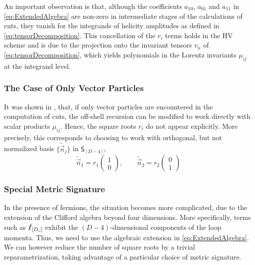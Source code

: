 An important observation is that, although the coefficients 
$a_{10}$, $a_{01}$ and $a_{11}$ in 
\cref{eq:ExtendedAlgebra} are non-zero in
intermediate stages of the calculations of cuts, they vanish
for the integrands of helicity amplitudes as defined in 
\cref{eq:tensorDecomposition}. This cancellation of the
$r_i$ terms holds in the HV scheme and
is due to the projection onto the invariant tensors 
$v_n$ of \cref{eq:tensorDecomposition}, 
which yields polynomials in the Lorentz invariants 
$\mu_{ij}$ at the integrand level.


\subsubsection{The Case of Only Vector Particles}
%
It was shown in \cite{Abreu:2017hqn}, that,
if only vector particles are encountered in the computation of cuts,
the off-shell recursion can be modified to work directly with scalar products $\mu_{ij}$.
Hence, the square roots $r_i$ do not appear explicitly.
More precisely, this corresponds to choosing to work with orthogonal, but not normalized basis $\{\tilde{\vec{n}}_j\}$ in
$\mathsf{S}_{[D-4]}$,
\begin{equation}
  \tilde{\vec{n}}_1 = r_1 \begin{pmatrix} 1 \\ 0\end{pmatrix}, \qquad \tilde{\vec{n}}_2 = r_2 \begin{pmatrix} 0 \\ 1 \end{pmatrix}
\end{equation}


\subsubsection{Special Metric Signature}
In the presence of fermions, the situation becomes more 
complicated, due to the extension of the Clifford algebra beyond 
four dimensions. More specifically, terms such as $\slashed{\ell}_{[D_s]}$
exhibit the $(D-4)$-dimensional components of the loop momenta.
Thus, we need to use the algebraic extension in \cref{eq:ExtendedAlgebra}.
We can however reduce the number of square roots by a trivial reparametrization, taking advantage of a particular choice
of metric signature.


